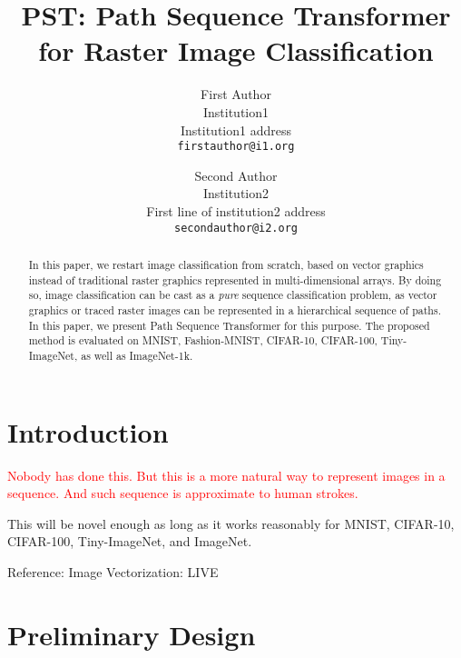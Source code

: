 \documentclass[10pt,twocolumn,letterpaper]{article}
\begin{document}
\title{PST: Path Sequence Transformer for Raster Image Classification}

\author{First Author\\
Institution1\\
Institution1 address\\
{\tt\small firstauthor@i1.org}
\and
Second Author\\
Institution2\\
First line of institution2 address\\
{\tt\small secondauthor@i2.org}
}
\maketitle

\begin{abstract}
    In this paper, we restart image classification from scratch, based on
    vector graphics instead of traditional raster graphics represented in
    multi-dimensional arrays.
    By doing so, image classification can be cast as a \textit{pure} sequence
    classification problem, as vector graphics or traced raster images
    can be represented in a hierarchical sequence of paths.
    In this paper, we present Path Sequence Transformer for this purpose.
    The proposed method is evaluated on MNIST, Fashion-MNIST, CIFAR-10,
    CIFAR-100, Tiny-ImageNet, as well as ImageNet-1k.
\end{abstract}

\section{Introduction}
\label{sec:intro}

\textcolor{red}{Nobody has done this. But this is a more natural way to represent images in a sequence. 
And such sequence is approximate to human strokes.}

This will be novel enough as long as it works reasonably for MNIST, CIFAR-10,
CIFAR-100, Tiny-ImageNet, and ImageNet.

Reference: Image Vectorization: LIVE \cite{live}

\section{Preliminary Design}
\end{document}
